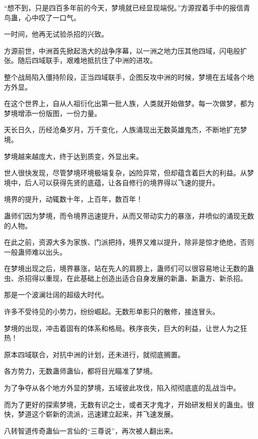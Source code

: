 
\begin{this_body}



“想不到，只是四百多年前的今天，梦境就已经显现端倪。”方源捏着手中的报信青鸟蛊，心中叹了一口气。

一时间，他再无试验杀招的兴致。

方源前世，中洲首先掀起浩大的战争序幕，以一洲之地力压其他四域，闪电般扩张。随后四域联手，艰难地抵抗住了中洲的进攻。

整个战局陷入僵持阶段，正当四域联手，企图反攻中洲的时候，梦境在五域各个地方外显。

在这个世界上，自从人祖衍化出第一批人族，人类就开始做梦。每一次做梦，都为梦境增添一份版图，一份力量。

天长日久，历经沧桑岁月，万千变化，人族涌现出无数英雄鬼杰，不断地扩充梦境。

梦境越来越庞大，终于达到质变，外显出来。

世人很快发现，尽管梦境环境极端复杂，凶险异常，但却蕴含着巨大的利益。从梦境中，后人可以获得先贤的底蕴，让各自修行的境界得以飞速的提升。

境界的提升，动辄数十年，上百年，数百年！

蛊师们因为梦境，而令境界迅速提升，从而又带动实力的暴涨，井喷似的涌现无数的人物。

在此之前，资源大多为家族、门派把持，境界又难以提升，除非是惊才绝绝，否则一般蛊师难以出头。

在梦境出现之后，境界暴涨，站在先人的肩膀上，蛊师们可以很容易地让无数的蛊虫、杀招得以重现，在此基础上创造出适合自身发展的新蛊、新蛊方、新杀招。

那是一个波澜壮阔的超级大时代。

许多不受待见的小势力，纷纷崛起。无数形单影只的散修，接连冒头。

梦境的出现，冲击着固有的体系和格局。秩序丧失，巨大的利益，让世人为之狂热！

原本四域联合，对抗中洲的计划，还未进行，就彻底搁置。

各方势力，无数蛊师蛊仙，都将目光瞄准了梦境。

为了争夺从各个地方外显的梦境，五域彼此攻伐，陷入彻彻底底的乱战当中。

而为了更好的探索梦境，无数有识之士，或者天才鬼才，开始研发相关的蛊虫。很快，梦道这个崭新的流派，迅速建立起来，并飞速发展。

八转智道传奇蛊仙一言仙的“三尊说”，再次被人翻出来。


\end{this_body}
